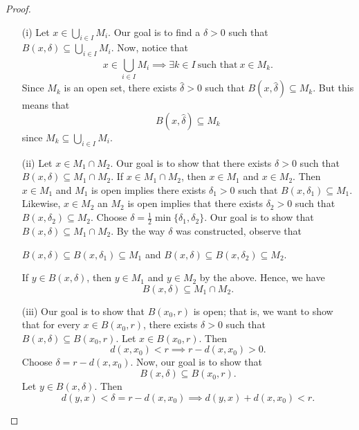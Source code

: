 \documentclass[a4paper]{article}
\begin{document}
\begin{proof}
\begin{enumerate}
    \item[(i)] Let \( x \in \bigcup_{ i \in I  }^{  } {M}_{i} \). Our goal is to find a \( \delta > 0  \) such that \( B(x,\delta) \subseteq \bigcup_{ i \in I  }^{  }  {M}_{i} \). Now, notice that 
        \[  x \in \bigcup_{ i \in I  }^{  } {M}_{i} \implies \exists k \in I \ \text{such that} \ x \in {M}_{k}.   \]
        Since \( {M}_{k} \) is an open set, there exists \( \hat{\delta} > 0  \) such that \( B(x, \hat{\delta}) \subseteq {M}_{k} \). But this means that 
        \[  B(x,\hat{\delta}) \subseteq {M}_{k} \]
        since \( {M}_{k} \subseteq \bigcup_{ i\in I  }^{  }  {M}_{i} \).
    \item[(ii)] Let \( x \in {M}_{1} \cap {M}_{2} \). Our goal is to show that there exists \( \delta > 0   \) such that \( B(x,\delta) \subseteq  {M}_{1} \cap {M}_{2} \). If \( x \in {M}_{1} \cap {M}_{2} \), then \( x \in {M}_{1} \) and \( x \in {M}_{2} \). Then \( x \in {M}_{1} \) and \( {M}_{1} \) is open implies there exists \( {\delta}_{1} > 0  \) such that \( B(x,{\delta}_{1}) \subseteq {M}_{1} \). Likewise, \( x \in {M}_{2} \) an \( {M}_{2}  \) is open implies that there exists \( {\delta}_{2} > 0  \) such that \( B(x,{\delta}_{2}) \subseteq {M}_{2} \). Choose \( \delta = \frac{ 1 }{ 2 }  \min \{ {\delta}_{1}, {\delta}_{2} \}  \). Our goal is to show that \( B(x,\delta) \subseteq {M}_{1} \cap {M}_{2} \). By the way \( \delta  \) was constructed, observe that  
        \begin{center}
            \( B(x,\delta) \subseteq B(x,{\delta}_{1}) \subseteq {M}_{1} \) and \( B(x,\delta) \subseteq B(x, {\delta}_{2}) \subseteq  {M}_{2} \).
        \end{center}
        If \( y \in B(x,\delta) \), then \( y \in {M}_{1} \) and \( y \in {M}_{2} \) by the above. Hence, we have 
        \[  B(x,\delta) \subseteq {M}_{1} \cap {M}_{2}. \]
    \item[(iii)] Our goal is to show that \( B({x}_{0}, r)  \) is open; that is, we want to show that for every \( x \in B({x}_{0}, r) \), there exists \( \delta > 0  \) such that \( B(x,\delta) \subseteq  B({x}_{0},r) \). Let \( x \in B({x}_{0} ,r) \). Then 
        \[  d(x,{x}_{0}) < r \implies r - d(x,{x}_{0}) > 0.  \]
        Choose \( \delta = r - d(x,{x}_{0}) \). Now, our goal is to show that 
        \[  B(x,\delta) \subseteq B({x}_{0}, r). \]
        Let \( y \in B(x,\delta) \). Then
        \[  d(y,x) < \delta = r - d(x,{x}_{0}) \implies d(y,x) + d(x, {x}_{0}) < r. \]

\end{enumerate}
\end{proof}
\end{document}

